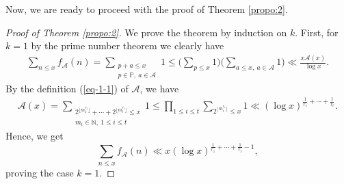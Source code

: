 \documentclass[12pt,a4paper,reqno]{amsart}
\numberwithin{equation}{section}
\theoremstyle{plain}
\theoremstyle{definition}
\begin{document}
Now, we are ready to proceed with the proof of Theorem \ref{propo:2}.
\begin{proof}[Proof of Theorem \ref{propo:2}]
We prove the theorem by induction on $k$. First, for $k=1$ by the prime number theorem we clearly have
\begin{align*}
\sum_{n\le x}f_{\mathcal{A}}(n)=\sum_{\substack{p+a\le x\\ p\in \mathbb{P},\ a\in \mathcal{A}}}1
\le \Big(\sum_{p\le x}1\Big) \Big(\sum_{a\le x,\ a\in \mathcal{A}}1\Big)\ll \frac{x\mathcal{A}(x)}{\log x}.
\end{align*}
By the definition (\ref{eq-1-1}) of $\mathcal{A}$, we have
\begin{align}\label{eq-add-1}
\mathcal{A}(x)=\sum_{\substack{2^{ \lfloor m_1^{r_1}\rfloor}+\cdots+2^{\lfloor m_t^{r_t}\rfloor}\le x\\m_i\in \mathbb{N},\ 1\le i\le t}}1\le \prod_{1\le i\le t}\sum_{2^{\lfloor m_i^{r_i}\rfloor}\le x}1\ll (\log x)^{\frac{1}{r_1}+\cdots+\frac{1}{r_t}}.
\end{align}
Hence, we get
$$
\sum_{n\le x}f_{\mathcal{A}}(n)\ll x(\log x)^{\frac{1}{r_1}+\cdots+\frac{1}{r_t}-1},
$$
proving the case $k=1$.


\end{proof}
\end{document}

